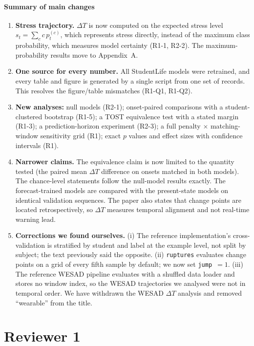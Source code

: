 \documentclass[11pt]{article}
\newcommand{\dt}{$\Delta T$}
\begin{document}
\paragraph{Summary of main changes}
\begin{enumerate}[leftmargin=*,itemsep=1pt]
\item \textbf{Stress trajectory.} \dt{} is now computed on the expected
stress level $s_t=\sum_c c\,p_t^{(c)}$, which represents stress
directly, instead of the maximum class probability, which measures model
certainty (R1-1, R2-2). The maximum-probability results move to
Appendix~A.
\item \textbf{One source for every number.} All StudentLife models were
retrained, and every table and figure is generated by a single script
from one set of records. This resolves the figure/table mismatches
(R1-Q1, R1-Q2).
\item \textbf{New analyses:} null models (R2-1); onset-paired
comparisons with a student-clustered bootstrap (R1-5); a TOST
equivalence test with a stated margin (R1-3); a prediction-horizon
experiment (R2-3); a full penalty $\times$ matching-window sensitivity
grid (R1); exact $p$ values and effect sizes with confidence intervals
(R1).
\item \textbf{Narrower claims.} The equivalence claim is now limited to
the quantity tested (the paired mean \dt{} difference on onsets matched
in both models). The chance-level statements follow the null-model
results exactly. The forecast-trained models are compared with the
present-state models on identical validation sequences.
The paper also states that change points are located retrospectively,
so \dt{} measures temporal alignment and not real-time warning lead.
\item \textbf{Corrections we found ourselves.} (i) The reference
implementation's cross-validation is stratified by student and label at
the example level, not split by subject; the text previously said the
opposite. (ii) \texttt{ruptures} evaluates change points on a grid of
every fifth sample by default; we now set \texttt{jump}~$=1$. (iii)
The reference WESAD pipeline evaluates with a shuffled data loader and
stores no window index, so the WESAD trajectories we analysed were not in
temporal order. We have withdrawn the WESAD \dt{} analysis and removed
``wearable'' from the title.
\end{enumerate}

\section*{Reviewer 1}
\end{document}
